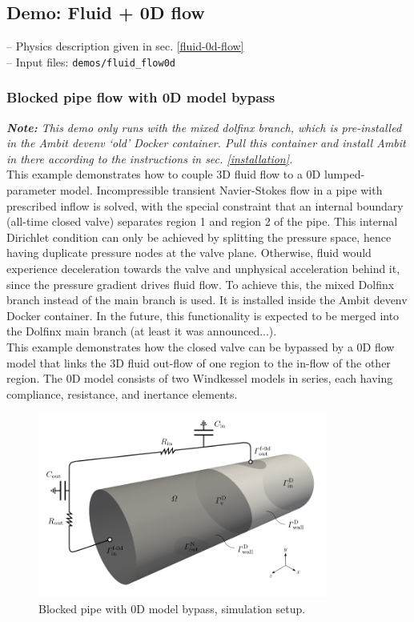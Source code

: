 \documentclass[a4paper,12pt]{report}
\begin{document}
\subsection{Demo: Fluid + 0D flow}\label{demo-fluid-0d-flow}

-- Physics description given in sec. \ref{fluid-0d-flow}\\

-- Input files: \verb"demos/fluid_flow0d"

\subsubsection*{Blocked pipe flow with 0D model bypass}

\textit{\textbf{Note:} This demo only runs with the mixed dolfinx branch, which is pre-installed in the Ambit devenv `old' Docker container. Pull this container and install Ambit in there according to the instructions in sec. \ref{installation}.}\\

This example demonstrates how to couple 3D fluid flow to a 0D lumped-parameter model. Incompressible transient Navier-Stokes flow in a pipe with prescribed inflow is solved,
with the special constraint that an internal boundary (all-time closed valve) separates region 1 and region 2 of the pipe. This internal Dirichlet condition can only be achieved
by splitting the pressure space, hence having duplicate pressure nodes at the valve plane. Otherwise, fluid would experience deceleration towards the valve and unphysical acceleration behind it, since the pressure gradient drives fluid flow. To achieve this, the mixed Dolfinx branch instead of the main branch is used. It is installed inside the Ambit devenv Docker
container. In the future, this functionality is expected to be merged into the Dolfinx main branch (at least it was announced...).\\

This example demonstrates how the closed valve can be bypassed by a 0D flow model that links the 3D fluid out-flow of one region to the in-flow of the other region. The 0D model consists of two Windkessel models in series, each having compliance, resistance, and inertance elements.

\begin{figure}
\centering
\includegraphics[width=0.85\textwidth]{fig/pipe_0d_setup.png}
\caption{Blocked pipe with 0D model bypass, simulation setup.}
\label{fig:pipe_0d_setup}
\end{figure}
\end{document}
